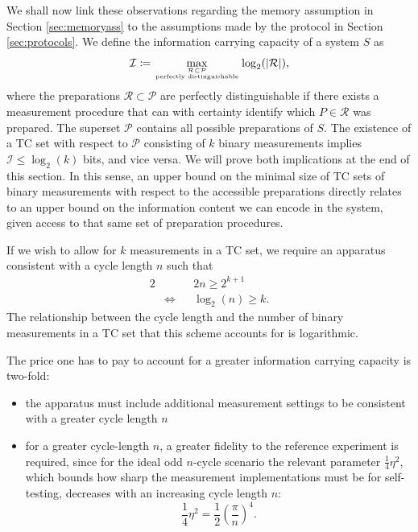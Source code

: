 We shall now link these observations regarding the memory assumption in Section \ref{sec:memoryass} to the assumptions made by the protocol in Section \ref{sec:protocols}.
We define the information carrying capacity of a system $S$ as 
\begin{equation*}
\mathcal{I}\coloneqq \max_{\mathcal{R}\subset \mathcal{P}\atop\text{perfectly distinguishable}}\log_2(\vert \mathcal{R} \vert),
\end{equation*}
where the preparations $\mathcal{R}\subset\mathcal{P}$ are perfectly distinguishable if there exists a measurement procedure that can with certainty identify which $P\in\mathcal{R}$ was prepared. The superset $\mathcal{P}$ contains all possible preparations of $S$.
The existence of a TC set with respect to $\mathcal{P}$ consisting of $k$ binary measurements implies $\mathcal{I} \leq \log_2(k)$ bits, and vice versa. We will prove both implications at the end of this section. In this sense, an upper bound on the minimal size of TC sets of binary measurements with respect to the accessible preparations directly relates to an upper bound on the information content we can encode in the system, given access to that same set of preparation procedures. 

If we wish to allow for $k$ measurements in a TC set, we require an apparatus consistent with a cycle length $n$ such that
\begin{alignat*}{2}
& && 2n\geq 2^{k+1} \\
& \iff && \log_2(n)\geq k.
\end{alignat*}
The relationship between the cycle length and the number of binary measurements in a TC set that this scheme accounts for is logarithmic.

The price one has to pay to account for a greater information carrying capacity is two-fold:
\begin{itemize}
\item the apparatus must include additional measurement settings to be consistent with a greater cycle length $n$
\item for a greater cycle-length $n$, a greater fidelity to the reference experiment is required, since for the ideal odd $n$-cycle scenario the relevant parameter $\frac{1}{4}\eta^2$, which bounds how sharp the measurement implementations must be for self-testing, decreases with an increasing cycle length $n$:
\begin{equation*}
\frac{1}{4}\eta^2 = \frac{1}{2}\left(\frac{\pi}{n}\right)^4.
\end{equation*}
\end{itemize}

